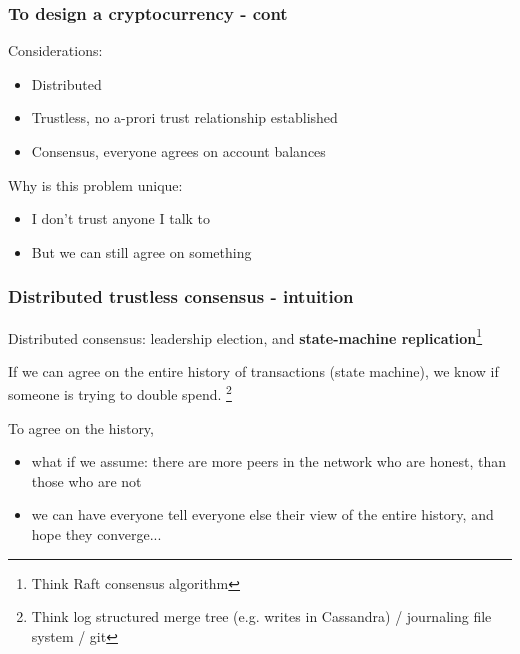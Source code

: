 \documentclass{beamer}
\begin{document}
\begin{frame}
\frametitle{To design a cryptocurrency - cont}

Considerations:
\begin{itemize}
  \item Distributed
  \item Trustless, no a-prori trust relationship established
  \item Consensus, everyone agrees on account balances
\end{itemize}

\vspace{0.3in}
Why is this problem unique:

\begin{itemize}
  \item I don't trust anyone I talk to
  \item But we can still agree on something
\end{itemize}

\end{frame}

\begin{frame}
\frametitle{Distributed trustless consensus - intuition}

Distributed consensus: leadership election, and \textbf{state-machine replication}\footnote{Think Raft consensus algorithm}

\vspace{0.2in}
If we can agree on the entire history of transactions (state machine), we know if someone is trying to double spend.
\footnote{Think log structured merge tree (e.g. writes in Cassandra) / journaling file system / git}

\vspace{0.2in}
To agree on the history,

\begin{itemize}
  \item what if we assume: there are more peers in the network who are honest, than those who are not
  \item we can have everyone tell everyone else their view of the entire history, and hope they converge...
\end{itemize}

\end{frame}
\end{document}
